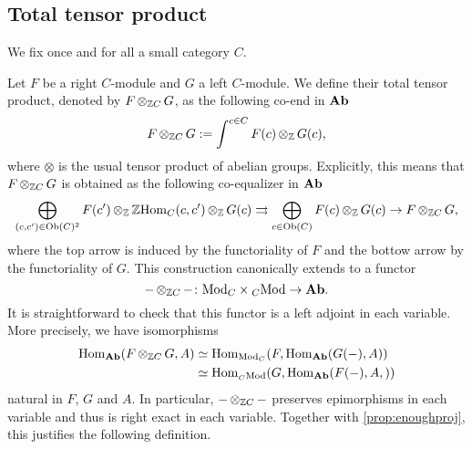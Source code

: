 \documentclass{amsart}
\renewcommand{\homset}[3]{\mathrm{Hom}_{#1}(#2,#3)}
\begin{document}
\subsection{Total tensor product}
We fix once and for all a small category $C$.
\begin{paragr}
   Let $F$ be a right $C$\nbd-module and $G$ a left $C$\nbd-module. We
  define their total tensor product, denoted by $F\operatorname{\otimes}_{\mathbb Z C}G$, as the
  following co-end in $\mathbf{Ab}$
  \[
    F\operatorname{\otimes}_{\mathbb Z C}G := \int^{c \in C}F(c)\operatorname{\otimes}_{\mathbb Z} G(c),
  \]
  where $\otimes$ is the usual tensor product of abelian
  groups. Explicitly, this means that $F\operatorname{\otimes}_{\mathbb Z C}G$ is obtained as the following
  co-equalizer in $\mathbf{Ab}$
  \[
    \bigoplus_{(c,c')\in \Ob(C)^2}F(c')\tens_{\Z}\Z\homset{C}{c}{c'}\tens_{\Z}
    G(c) \rightrightarrows \bigoplus_{c \in \Ob(C)}F(c)\tens_{\Z} G(c)
    \rightarrow F\tens_{\Z C}G,
  \]
  where the top arrow is induced by the functoriality of $F$ and the
  bottow arrow by the functoriality of $G$. This construction canonically extends to a functor
  \[
    - \operatorname{\otimes}_{\mathbb Z C} - \colon \mathrm{Mod}_{C}\times{}_{C}\mathrm{Mod} \to \mathbf{Ab}.
  \]
  It is straightforward to check that this functor is a left adjoint
  in each variable. More precisely, we have isomorphisms
  \[
    \begin{aligned}
      \homset{\Ab}{F\tens_{\Z C}G}{A}&\simeq
                                  \homset{\RMod{C}}{F}{\homset{\Ab}{G(-)}{A}}\\
      &\simeq \homset{\LMod{C}}{G}{\homset{\Ab}{F(-),A}}
    \end{aligned}
  \]
  natural in $F$, $G$ and $A$. In particular, $-\operatorname{\otimes}_{\mathbb Z C}-$ preserves
  epimorphisms in each variable and thus is right exact in each
  variable. Together with \cref{prop:enoughproj}, this justifies the
  following definition.
\end{paragr}
\end{document}
